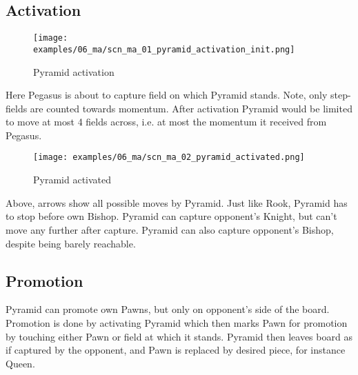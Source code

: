 \subsection*{Activation}
\label{sec:Mayan Ascendancy/Pyramid/Activation}

\noindent
\begin{figure}[!h]
\texttt{[image: examples/06\_ma/scn\_ma\_01\_pyramid\_activation\_init.png]}
\caption{Pyramid activation}
\label{fig:scn_ma_01_pyramid_activation_init}
\end{figure}

Here Pegasus is about to capture field on which Pyramid stands. Note, only
step-fields are counted towards momentum. After activation Pyramid would be
limited to move at most 4 fields across, i.e. at most the momentum it received
from Pegasus.

\clearpage %

\noindent
\begin{figure}[!h]
\texttt{[image: examples/06\_ma/scn\_ma\_02\_pyramid\_activated.png]}
\caption{Pyramid activated}
\label{fig:scn_ma_02_pyramid_activated}
\end{figure}

Above, arrows show all possible moves by Pyramid. Just like Rook, Pyramid has to
stop before own Bishop. Pyramid can capture opponent's Knight, but can't move any
further after capture. Pyramid can also capture opponent's Bishop, despite being
barely reachable.

\clearpage %

\subsection*{Promotion}
\label{sec:Mayan Ascendancy/Pyramid/Promotion}

Pyramid can promote own Pawns, but only on opponent's side of the board.
Promotion is done by activating Pyramid which then marks Pawn for promotion
by touching either Pawn or field at which it stands. Pyramid then leaves
board as if captured by the opponent, and Pawn is replaced by desired piece,
for instance Queen.

